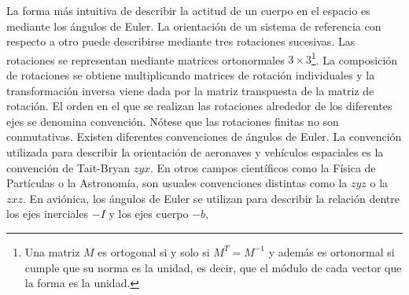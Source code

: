 \documentclass[a4paper,12pt]{book}
\begin{document}
La forma más intuitiva de describir la actitud de un cuerpo en el espacio es mediante los ángulos de Euler. La orientación de un sistema de referencia con respecto a otro puede describirse mediante tres rotaciones sucesivas. Las rotaciones se representan mediante matrices ortonormales $3\times3$\footnote{Una matriz $M$ es ortogonal si y solo si $M^T=M^{-1}$ y además es ortonormal si cumple que su norma es la unidad, es decir, que el módulo de cada vector que la forma es la unidad.}. La composición de rotaciones se obtiene multiplicando matrices de rotación individuales y la transformación inversa viene dada por la matriz transpuesta de la matriz de rotación. El orden en el que se realizan las rotaciones alrededor de los diferentes ejes se denomina convención. Nótese que las rotaciones finitas no son conmutativas. Existen diferentes convenciones de ángulos de Euler. La convención utilizada para describir la orientación de aeronaves y vehículos espaciales es la convención de Tait-Bryan $zyx$. En otros campos científicos como la Física de Partículas o la Astronomía, son usuales convenciones distintas como la $zyz$ o la $zxz$. En aviónica, los ángulos de Euler se utilizan para describir la relación dentre los ejes inerciales $-I$ y los ejes cuerpo $-b$,\\
\end{document}
